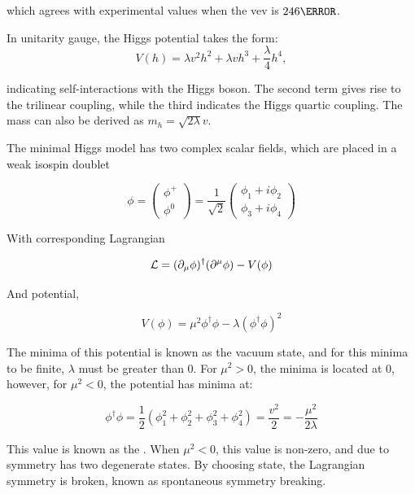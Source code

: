 which agrees with experimental values when the \gls{vev} is $\unit{246}{\GeV}$.


In unitarity gauge, the Higgs potential takes the form:
\begin{equation}
    V(h) = \lambda v^2 h^2 + \lambda v h^3 + \frac{\lambda}{4}h^4,
\end{equation}

indicating self-interactions with the Higgs boson. The second term gives rise to the trilinear coupling, while the third indicates the Higgs quartic coupling. The mass can also be derived as $m_h = \sqrt{2\lambda}v$. 


The minimal Higgs model has two complex scalar fields, which are placed in a weak isospin doublet

\begin{equation}
\phi = \begin{pmatrix} \phi^+ \\ \phi^0 \end{pmatrix}
    = \frac{1}{\sqrt{2}}\begin{pmatrix}
        \phi_1 + i\phi_2 \\ \phi_3 + i\phi_4
    \end{pmatrix}
\end{equation}

With corresponding Lagrangian

\begin{equation} \label{higgs-lagrangian}
    \mathcal{L} = (\partial_{\mu}\phi)^\dagger (\partial^{\mu}\phi) - V(\phi)\\
\end{equation}

And potential,

\begin{equation} \label{higgs-potential}
    V(\phi) = \mu^2\phi^\dagger \phi - \lambda(\phi^\dagger \phi)^2
\end{equation}

The minima of this potential is known as the vacuum state, and for this minima to be finite, $\lambda$ must be greater than 0. For $\mu^2 >0$, the minima is located at 0, however, for $\mu^2<0$, the potential has minima at:

\begin{equation}
    \phi^\dagger \phi = \frac{1}{2}(\phi_{1}^{2}+\phi_{2}^{2}+\phi_{3}^{2}+\phi_{4}^{2}) = \frac{v^2}{2} = -\frac{\mu^2}{2\lambda}
\end{equation}

This value is known as the . When $\mu^2 < 0$, this value is non-zero, and due to symmetry has two degenerate states. By choosing state, the Lagrangian symmetry is broken, known as spontaneous symmetry breaking.


